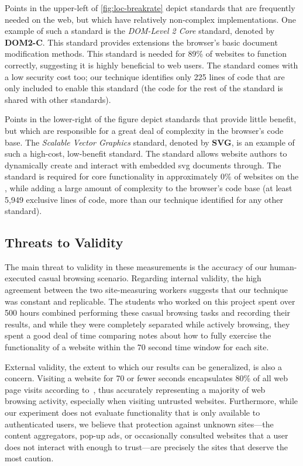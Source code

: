 Points in the upper-left of \ref{fig:loc-breakrate} depict standards that are
frequently needed on the web, but which have relatively non-complex
implementations.  One example of such a standard is the \textit{DOM-Level 2
Core} standard, denoted by \textbf{DOM2-C}.  This standard provides extensions
the browser's basic document modification methods.  This standard is needed for
89\% of websites to function correctly, suggesting it is highly beneficial to
web users.  The standard comes with a low security cost too; our technique
identifies only 225 lines of code that are only included to enable this
standard (the code for the rest of the standard is shared with other
standards).

Points in the lower-right of the figure depict standards that provide
little benefit, but which are responsible for a great deal
of complexity in the browser's code base.  The \textit{Scalable Vector
Graphics} standard, denoted by \textbf{SVG}, is an example of
such a high-cost, low-benefit standard.  The standard allows website authors
to dynamically create and interact with embedded \gls{svg} documents through.
The standard is required for core functionality in approximately 0\% of
websites on the \ATK, while adding a large amount of complexity to the
browser's code base (at least 5,949 exclusive lines of code, more than our
technique identified for any other standard).


\subsection{Threats to Validity}
The main threat to validity in these measurements is the accuracy of our
human-executed casual browsing scenario. Regarding internal validity, the high
agreement between the two site-measuring workers suggests that our technique
was constant and replicable.  The students who worked on this project spent
over 500 hours combined performing these casual browsing tasks and recording
their results, and while they were completely separated while actively
browsing, they spent a good deal of time comparing notes about how to fully
exercise the functionality of a website within the 70 second time window for
each site.

External validity, the extent to which our results can be generalized, is also
a concern. Visiting a website for 70 or fewer seconds encapsulates 80\% of all
web page visits according to~\cite{liu2010understanding}, thus accurately
representing a majority of web browsing activity, especially when visiting
untrusted websites. Furthermore, while our experiment does not evaluate
functionality that is only available to authenticated users, we believe that
protection against unknown sites---the content aggregators, pop-up ads, or
occasionally consulted websites that a user does not interact with enough to
trust---are precisely the sites that deserve the most caution.
